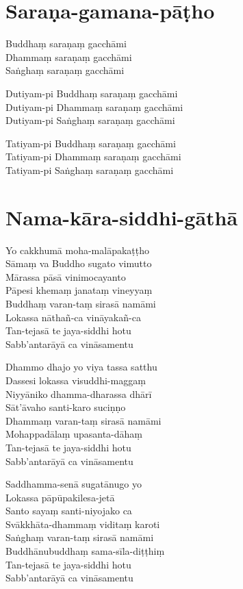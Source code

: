\chapter{Saraṇa-gamana-pāṭho}%


\begin{paritta}
Buddhaṃ saraṇaṃ gacchāmi\\
Dhammaṃ saraṇaṃ gacchāmi\\
Saṅghaṃ saraṇaṃ gacchāmi

Dutiyam-pi Buddhaṃ saraṇaṃ gacchāmi\\
Dutiyam-pi Dhammaṃ saraṇaṃ gacchāmi\\
Dutiyam-pi Saṅghaṃ saraṇaṃ gacchāmi

Tatiyam-pi Buddhaṃ saraṇaṃ gacchāmi\\
Tatiyam-pi Dhammaṃ saraṇaṃ gacchāmi\\
Tatiyam-pi Saṅghaṃ saraṇaṃ gacchāmi
\end{paritta}

\chapter{Nama-kāra-siddhi-gāthā}%


\begin{paritta}
Yo cakkhumā moha-malāpakaṭṭho\\
Sāmaṃ va Buddho sugato vimutto\\
Mārassa pāsā vinimocayanto\\
Pāpesi khemaṃ janataṃ vineyyaṃ\\
Buddhaṃ varan-taṃ sirasā namāmi\\
Lokassa nāthañ-ca vināyakañ-ca\\
Tan-tejasā te jaya-siddhi hotu\\
Sabb'antarāyā ca vināsamentu

Dhammo dhajo yo viya tassa satthu\\
Dassesi lokassa visuddhi-maggaṃ\\
Niyyāniko dhamma-dharassa dhārī\\
Sāt'āvaho santi-karo suciṇṇo\\
Dhammaṃ varan-taṃ sirasā namāmi\\
Mohappadālaṃ upasanta-dāhaṃ\\
Tan-tejasā te jaya-siddhi hotu\\
Sabb'antarāyā ca vināsamentu

Saddhamma-senā sugatānugo yo\\
Lokassa pāpūpakilesa-jetā\\
Santo sayaṃ santi-niyojako ca\\
Svākkhāta-dhammaṃ viditaṃ karoti\\
Saṅghaṃ varan-taṃ sirasā namāmi\\
Buddhānubuddhaṃ sama-sīla-diṭṭhiṃ\\
Tan-tejasā te jaya-siddhi hotu\\
Sabb'antarāyā ca vināsamentu
\end{paritta}

